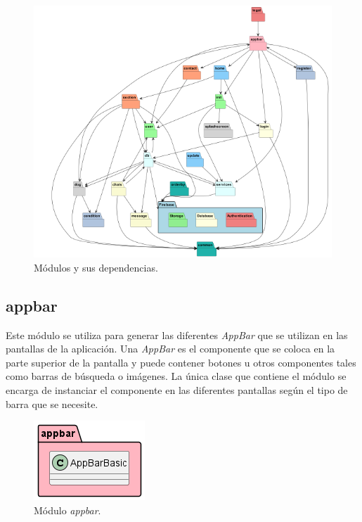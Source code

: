 \documentclass[a4paper, 12pt]{article}
\begin{document}
\begin{figure}[H]
	\begin{center}
		{\includegraphics[width=13cm]{diagram/MODULES.png}\par}
		\caption{Módulos y sus dependencias.}
	\end{center}
\end{figure}


\newpage
\subsection*{appbar}


Este módulo se utiliza para generar las diferentes \textit{AppBar} que se utilizan en las pantallas de la aplicación. Una \textit{AppBar} es el componente que se coloca en la parte superior de la pantalla y puede contener botones u otros componentes tales como barras de búsqueda o imágenes. La única clase que contiene el módulo se encarga de instanciar el componente en las diferentes pantallas según el tipo de barra que se necesite.

\begin{figure}[H]
	\begin{center}
		{\includegraphics[]{diagram/AppBar.png}\par}
		\caption{Módulo \textit{appbar}.}
	\end{center}
\end{figure}
\end{document}
